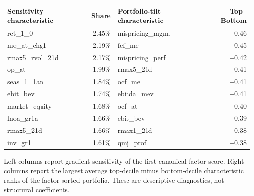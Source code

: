\begin{threeparttable}
\begin{tabular}{lrlr}
\toprule
Sensitivity characteristic & Share & Portfolio-tilt characteristic & Top--Bottom \\
\midrule
ret\_1\_0 & 2.45\% & mispricing\_mgmt & +0.46 \\
niq\_at\_chg1 & 2.19\% & fcf\_me & +0.45 \\
rmax5\_rvol\_21d & 2.17\% & mispricing\_perf & +0.42 \\
op\_at & 1.99\% & rmax5\_21d & -0.41 \\
seas\_1\_1an & 1.84\% & ocf\_me & +0.41 \\
ebit\_bev & 1.74\% & ebitda\_mev & +0.41 \\
market\_equity & 1.68\% & ocf\_at & +0.40 \\
lnoa\_gr1a & 1.66\% & ebit\_bev & +0.39 \\
rmax5\_21d & 1.66\% & rmax1\_21d & -0.38 \\
inv\_gr1 & 1.61\% & qmj\_prof & +0.38 \\
\bottomrule
\end{tabular}
\begin{tablenotes}\footnotesize\item Left columns report gradient sensitivity of the first canonical factor score. Right columns report the largest average top-decile minus bottom-decile characteristic ranks of the factor-sorted portfolio. These are descriptive diagnostics, not structural coefficients.\end{tablenotes}
\end{threeparttable}
